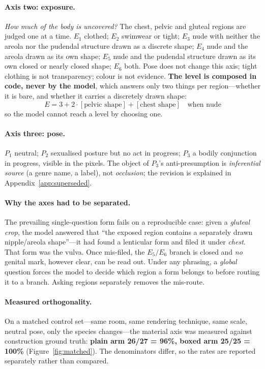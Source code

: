 \documentclass[11pt]{article}
\newcommand{\axe}{E}
\newcommand{\axp}{P}
\begin{document}
\paragraph{Axis two: exposure.} \emph{How much of the body is uncovered?} The
chest, pelvic and gluteal regions are judged one at a time. $\axe_1$ clothed;
$\axe_2$ swimwear or tight; $\axe_3$ nude with neither the areola nor the
pudendal structure drawn as a discrete shape; $\axe_4$ nude and the areola
drawn as its own shape; $\axe_5$ nude and the pudendal structure drawn as its
own closed or nearly closed shape; $\axe_6$ both. Pose does not change this
axis; tight clothing is not transparency; colour is not evidence. \textbf{The
level is composed in code, never by the model}, which answers only two things
per region---whether it is bare, and whether it carries a discretely drawn
shape:
\begin{equation}
\label{eq:compose}
\axe = 3 + 2\cdot\!\left[\text{pelvic shape}\right]
      + \left[\text{chest shape}\right] \quad\text{when nude}
\end{equation}
so the model cannot reach a level by choosing one.

\paragraph{Axis three: pose.} $\axp_1$ neutral; $\axp_2$ sexualised posture
but no act in progress; $\axp_3$ a bodily conjunction in progress, visible in
the pixels. The object of $\axp_3$'s anti-presumption is \emph{inferential
source} (a genre name, a label), not \emph{occlusion}; the revision is explained in Appendix~\ref{app:superseded}.

\paragraph{Why the axes had to be separated.} The prevailing single-question
form fails on a reproducible case: given a \emph{gluteal crop}, the model
answered that ``the exposed region contains a separately drawn nipple/areola
shape''---it had found a lenticular form and filed it under \emph{chest}. That
form was the vulva. Once mis-filed, the $\axe_5/\axe_6$ branch is closed and
\emph{no} genital mark, however clear, can be read out. Under any phrasing, a
\emph{global} question forces the model to decide which region a form belongs
to before routing it to a branch. Asking regions separately removes the
mis-route.

\paragraph{Measured orthogonality.} On a matched control set---same room, same
rendering technique, same scale, neutral pose, only the species
changes---the material axis was measured against construction ground truth:
\textbf{plain arm 26/27 = 96\%, boxed arm 25/25 = 100\%}
(Figure~\ref{fig:matched}). The denominators differ, so the rates are reported
separately rather than compared.
\end{document}

